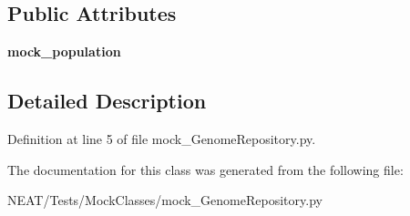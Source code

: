 \subsection*{Public Attributes}
\begin{DoxyCompactItemize}
\item 
{\bfseries mock\+\_\+population}\hypertarget{class_n_e_a_t___py_genetics_1_1_n_e_a_t_1_1_tests_1_1_mock_classes_1_1mock___genome_repository_1_1mock___genome_repository_abb2dfb4fa59c22b09dede3bcbd27ca4b}{}\label{class_n_e_a_t___py_genetics_1_1_n_e_a_t_1_1_tests_1_1_mock_classes_1_1mock___genome_repository_1_1mock___genome_repository_abb2dfb4fa59c22b09dede3bcbd27ca4b}

\end{DoxyCompactItemize}


\subsection{Detailed Description}


Definition at line 5 of file mock\+\_\+\+Genome\+Repository.\+py.



The documentation for this class was generated from the following file\+:\begin{DoxyCompactItemize}
\item 
N\+E\+A\+T/\+Tests/\+Mock\+Classes/mock\+\_\+\+Genome\+Repository.\+py\end{DoxyCompactItemize}
